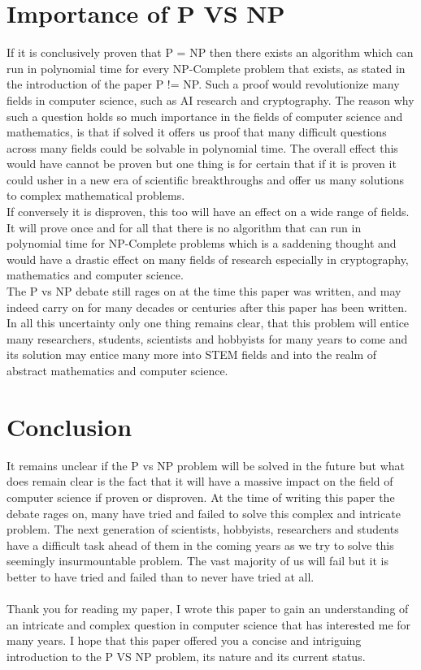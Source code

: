 \documentclass{report}
\begin{document}
\chapter{Importance of P VS NP}
If it is conclusively proven that P = NP then there exists an algorithm which can run in polynomial time for every NP-Complete problem that exists, as stated in the introduction of the paper P != NP\cite{P!=NP}.  Such a proof would revolutionize many fields in computer science, such as AI research and cryptography.  The reason why such a question holds so much importance in the fields of computer science and mathematics, is that if solved it offers us proof that many difficult questions across many fields could be solvable in polynomial time.  The overall effect this would have cannot be proven but one thing is for certain that if it is proven it could usher in a new era of scientific breakthroughs and offer us many solutions to complex mathematical problems.
\\
If conversely it is disproven, this too will have an effect on a wide range of fields.  It will prove once and for all that there is no algorithm that can run in polynomial time for NP-Complete problems which is a saddening thought and would have a drastic effect on many fields of research especially in cryptography, mathematics and computer science.
\\
The P vs NP debate still rages on at the time this paper was written, and may indeed carry on for many decades or centuries after this paper has been written.  In all this uncertainty only one thing remains clear, that this problem will entice many researchers, students, scientists and hobbyists for many years to come and its solution may entice many more into STEM fields and into the realm of abstract mathematics and computer science.
\chapter{Conclusion}
It remains unclear if the P vs NP problem will be solved in the future but what does remain clear is the fact that it will have a massive impact on the field of computer science if proven or disproven.  At the time of writing this paper the debate rages on, many have tried and failed to solve this complex and intricate problem.  The next generation of scientists, hobbyists, researchers and students have a difficult task ahead of them in the coming years as we try to solve this seemingly insurmountable problem.  The vast majority of us will fail but it is better to have tried and failed than to never have tried at all.
\\
\\
Thank you for reading my paper, I wrote this paper to gain an understanding of an intricate and complex question in computer science that has interested me for many years.  I hope that this paper offered you a concise and intriguing introduction to the P VS NP problem, its nature and its current status.


\end{document}
